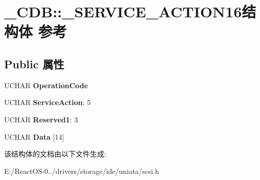 \hypertarget{struct___c_d_b_1_1___s_e_r_v_i_c_e___a_c_t_i_o_n16}{}\section{\+\_\+\+C\+DB\+:\+:\+\_\+\+S\+E\+R\+V\+I\+C\+E\+\_\+\+A\+C\+T\+I\+O\+N16结构体 参考}
\label{struct___c_d_b_1_1___s_e_r_v_i_c_e___a_c_t_i_o_n16}
\subsection*{Public 属性}
\begin{DoxyCompactItemize}
\item 
\mbox{\label{struct___c_d_b_1_1___s_e_r_v_i_c_e___a_c_t_i_o_n16_a8df73e56b30c2b1df135e70194aeaf6f}} 
U\+C\+H\+AR {\bfseries Operation\+Code}
\item 
\mbox{\label{struct___c_d_b_1_1___s_e_r_v_i_c_e___a_c_t_i_o_n16_aa81d9ebe2af2ca1c46c454f46bb75813}} 
U\+C\+H\+AR {\bfseries Service\+Action}\+: 5
\item 
\mbox{\label{struct___c_d_b_1_1___s_e_r_v_i_c_e___a_c_t_i_o_n16_aaa700a28d7cea1b548320042b0497837}} 
U\+C\+H\+AR {\bfseries Reserved1}\+: 3
\item 
\mbox{\label{struct___c_d_b_1_1___s_e_r_v_i_c_e___a_c_t_i_o_n16_a60f330ddb4c3e014d023beeb90fa78d6}} 
U\+C\+H\+AR {\bfseries Data} \mbox{[}14\mbox{]}
\end{DoxyCompactItemize}


该结构体的文档由以下文件生成\+:\begin{DoxyCompactItemize}
\item 
E\+:/\+React\+O\+S-\/0../drivers/storage/ide/uniata/scsi.\+h\end{DoxyCompactItemize}

